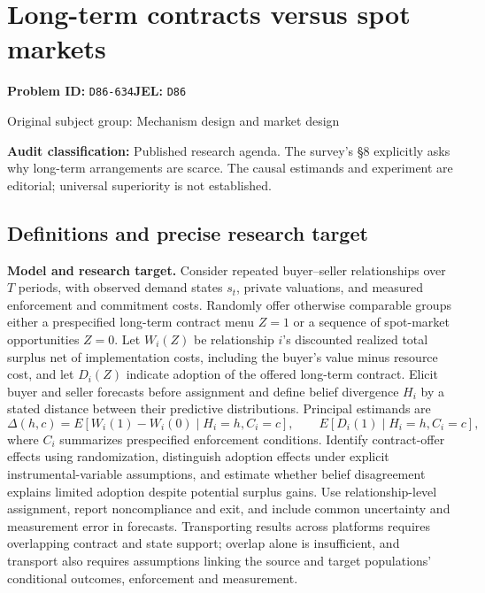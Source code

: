 \documentclass[11pt,a4paper]{article}
\begin{document}
\section*{Long-term contracts versus spot markets}
\textbf{Problem ID:} \texttt{D86-634}\quad \textbf{JEL:} \texttt{D86}\par
\label{problem:OP-0293}
{\sffamily\small\color{muted}Original subject group: Mechanism design and market design\par}
\label{definitions:problem:30007575}
\textbf{Audit classification:} Published research agenda. The survey’s §8 explicitly asks why long-term arrangements are scarce. The causal estimands and experiment are editorial; universal superiority is not established.
\subsection*{Definitions and precise research target}
\textbf{Model and research target.} Consider repeated buyer–seller relationships over \(T\) periods, with observed demand states \(s_t\), private valuations, and measured enforcement and commitment costs. Randomly offer otherwise comparable groups either a prespecified long-term contract menu \(Z=1\) or a sequence of spot-market opportunities \(Z=0\). Let \(W_i(Z)\) be relationship \(i\)'s discounted realized total surplus net of implementation costs, including the buyer's value minus resource cost, and let \(D_i(Z)\) indicate adoption of the offered long-term contract. Elicit buyer and seller forecasts before assignment and define belief divergence \(H_i\) by a stated distance between their predictive distributions. Principal estimands are
\[
 \Delta(h,c)=E[W_i(1)-W_i(0)\mid H_i=h,C_i=c],
 \qquad E[D_i(1)\mid H_i=h,C_i=c],
\]
where \(C_i\) summarizes prespecified enforcement conditions. Identify contract-offer effects using randomization, distinguish adoption effects under explicit instrumental-variable assumptions, and estimate whether belief disagreement explains limited adoption despite potential surplus gains. Use relationship-level assignment, report noncompliance and exit, and include common uncertainty and measurement error in forecasts. Transporting results across platforms requires overlapping contract and state support; overlap alone is insufficient, and transport also requires assumptions linking the source and target populations' conditional outcomes, enforcement and measurement.
\end{document}
